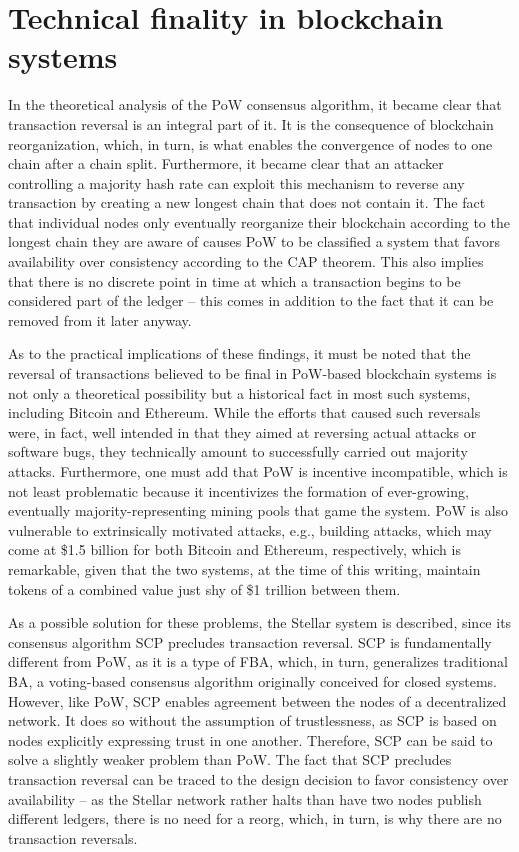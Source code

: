 \section{Technical finality in blockchain systems}

In the theoretical analysis of the PoW consensus algorithm, it became clear that transaction reversal is an integral part of it.
It is the consequence of blockchain reorganization, which, in turn, is what enables the convergence of nodes to one chain after a chain split.
Furthermore, it became clear that an attacker controlling a majority hash rate can exploit this mechanism to reverse any transaction by creating a new longest chain that does not contain it.
The fact that individual nodes only eventually reorganize their blockchain according to the longest chain they are aware of causes PoW to be classified a system that favors availability over consistency according to the CAP theorem.
This also implies that there is no discrete point in time at which a transaction begins to be considered part of the ledger -- this comes in addition to the fact that it can be removed from it later anyway.

As to the practical implications of these findings, it must be noted that the reversal of transactions believed to be final in PoW-based blockchain systems is not only a theoretical possibility but a historical fact in most such systems, including Bitcoin and Ethereum.
While the efforts that caused such reversals were, in fact, well intended in that they aimed at reversing actual attacks or software bugs, they technically amount to successfully carried out majority attacks.
Furthermore, one must add that PoW is incentive incompatible, which is not least problematic because it incentivizes the formation of ever-growing, eventually majority-representing mining pools that game the system.
PoW is also vulnerable to extrinsically motivated attacks, e.g., building attacks, which may come at \$1.5 billion for both Bitcoin and Ethereum, respectively, which is remarkable, given that the two systems, at the time of this writing, maintain tokens of a combined value just shy of \$1 trillion between them.

As a possible solution for these problems, the Stellar system is described, since its consensus algorithm SCP precludes transaction reversal.
SCP is fundamentally different from PoW, as it is a type of FBA, which, in turn, generalizes traditional BA, a voting-based consensus algorithm originally conceived for closed systems.
However, like PoW, SCP enables agreement between the nodes of a decentralized network.
It does so without the assumption of trustlessness, as SCP is based on nodes explicitly expressing trust in one another.
Therefore, SCP can be said to solve a slightly weaker problem than PoW.
The fact that SCP precludes transaction reversal can be traced to the design decision to favor consistency over availability -- as the Stellar network rather halts than have two nodes publish different ledgers, there is no need for a reorg, which, in turn, is why there are no transaction reversals.

